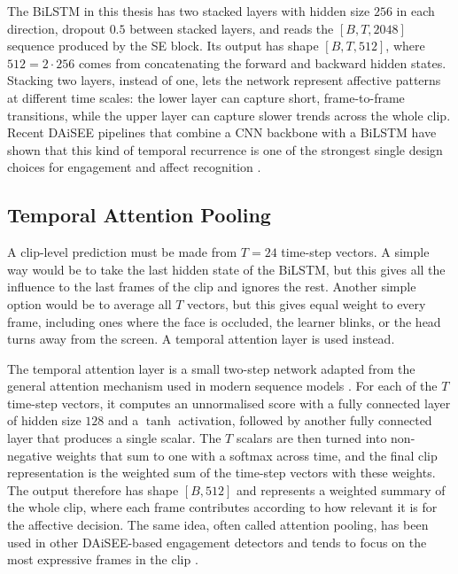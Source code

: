 The BiLSTM in this thesis has two stacked layers with hidden size $256$ in each direction, dropout $0.5$ between stacked layers, and reads the $[B, T, 2048]$ sequence produced by the SE block. Its output has shape $[B, T, 512]$, where $512 = 2 \cdot 256$ comes from concatenating the forward and backward hidden states. Stacking two layers, instead of one, lets the network represent affective patterns at different time scales: the lower layer can capture short, frame-to-frame transitions, while the upper layer can capture slower trends across the whole clip. Recent DAiSEE pipelines that combine a CNN backbone with a BiLSTM have shown that this kind of temporal recurrence is one of the strongest single design choices for engagement and affect recognition \cite{asaju_adaptive_2022,asaju_affects_2021,shiri_detection_2024,tulsani_realtime_2025}.

\subsection{Temporal Attention Pooling}\label{sec:method_temporal_attention}

A clip-level prediction must be made from $T = 24$ time-step vectors. A simple way would be to take the last hidden state of the BiLSTM, but this gives all the influence to the last frames of the clip and ignores the rest. Another simple option would be to average all $T$ vectors, but this gives equal weight to every frame, including ones where the face is occluded, the learner blinks, or the head turns away from the screen. A temporal attention layer is used instead.

The temporal attention layer is a small two-step network adapted from the general attention mechanism used in modern sequence models \cite{vaswani_attention_2017,mehta_three-dimensional_2022,su_leveraging_2024}. For each of the $T$ time-step vectors, it computes an unnormalised score with a fully connected layer of hidden size $128$ and a $\tanh$ activation, followed by another fully connected layer that produces a single scalar. The $T$ scalars are then turned into non-negative weights that sum to one with a softmax across time, and the final clip representation is the weighted sum of the time-step vectors with these weights. The output therefore has shape $[B, 512]$ and represents a weighted summary of the whole clip, where each frame contributes according to how relevant it is for the affective decision. The same idea, often called attention pooling, has been used in other DAiSEE-based engagement detectors and tends to focus on the most expressive frames in the clip \cite{mehta_three-dimensional_2022,su_leveraging_2024,liu_dynamic_nodate}.

